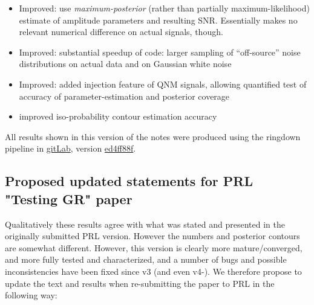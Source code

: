 \documentclass[aps,prd,onecolumn,notitlepage,nofootinbib,superscriptaddress,altaffilletter,floatfix]{revtex4-1}
\begin{document}
\begin{itemize}
\item Improved: use \emph{maximum-posterior} (rather than partially maximum-likelihood) estimate of amplitude parameters and resulting SNR. Essentially
  makes no relevant numerical difference on actual signals, though.

\item Improved: substantial speedup of code: larger sampling of ``off-source'' noise distributions on actual data and on Gaussian white noise

\item Improved: added injection feature of QNM signals, allowing quantified test of accuracy of parameter-estimation and posterior coverage

\item improved iso-probability contour estimation accuracy

\end{itemize}

All results shown in this version of the notes were produced using the ringdown pipeline in
\href{https://git.ligo.org/BlackHole-QNM-Ringdown/Bayesian-QNM-PE-octave}{gitLab}, version
\href{https://git.ligo.org/BlackHole-QNM-Ringdown/Bayesian-QNM-PE-octave/commit/ed4ff88fbe557f371fab4fded258f0b4fe03c67c}{ed4ff88f}.

\newpage
\subsection{Proposed updated statements for PRL "Testing GR" paper}
\label{sec:prop-updat-stat}

Qualitatively these results agree with what was stated and presented in the originally submitted PRL version.
However the numbers and posterior contours are somewhat different.
However, this version is clearly more mature/converged, and more fully tested and characterized, and a number of bugs and possible inconsistencies
have been fixed since v3 (and even v4-).
We therefore propose to update the text and results when re-submitting the paper to PRL in the following way:
\end{document}
